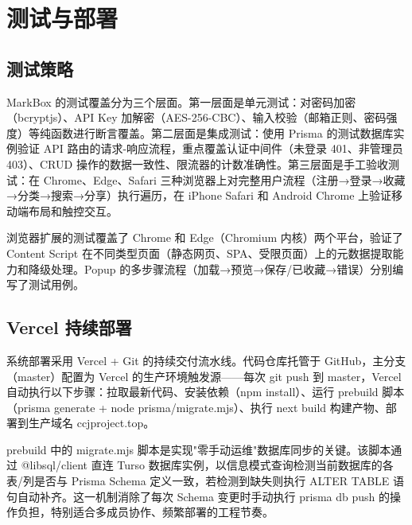 \documentclass[a4paper,12pt]{ctexart}
\begin{document}


\section{测试与部署}

\subsection{测试策略}

MarkBox 的测试覆盖分为三个层面。第一层面是单元测试：对密码加密（bcryptjs）、API Key 加解密（AES-256-CBC）、输入校验（邮箱正则、密码强度）等纯函数进行断言覆盖。第二层面是集成测试：使用 Prisma 的测试数据库实例验证 API 路由的请求-响应流程，重点覆盖认证中间件（未登录 401、非管理员 403）、CRUD 操作的数据一致性、限流器的计数准确性。第三层面是手工验收测试：在 Chrome、Edge、Safari 三种浏览器上对完整用户流程（注册→登录→收藏→分类→搜索→分享）执行遍历，在 iPhone Safari 和 Android Chrome 上验证移动端布局和触控交互。

浏览器扩展的测试覆盖了 Chrome 和 Edge（Chromium 内核）两个平台，验证了Content Script 在不同类型页面（静态网页、SPA、受限页面）上的元数据提取能力和降级处理。Popup 的多步骤流程（加载→预览→保存/已收藏→错误）分别编写了测试用例。

\subsection{Vercel 持续部署}

系统部署采用 Vercel + Git 的持续交付流水线。代码仓库托管于 GitHub，主分支（master）配置为 Vercel 的生产环境触发源——每次 git push 到 master，Vercel 自动执行以下步骤：拉取最新代码、安装依赖（npm install）、运行 prebuild 脚本（prisma generate + node prisma/migrate.mjs）、执行 next build 构建产物、部署到生产域名 ccjproject.top。

prebuild 中的 migrate.mjs 脚本是实现"零手动运维"数据库同步的关键。该脚本通过 @libsql/client 直连 Turso 数据库实例，以信息模式查询检测当前数据库的各表/列是否与 Prisma Schema 定义一致，若检测到缺失则执行 ALTER TABLE 语句自动补齐。这一机制消除了每次 Schema 变更时手动执行 prisma db push 的操作负担，特别适合多成员协作、频繁部署的工程节奏。
\end{document}
